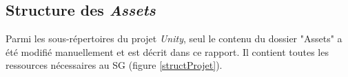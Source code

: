 	\subsection*{Structure des \textit{Assets}}
		Parmi les sous-répertoires du projet \textit{Unity}, seul le contenu du dossier "Assets" a été modifié manuellement et est décrit dans ce rapport. Il contient toutes les ressources nécessaires au SG (figure \ref{structProjet}).\medskip
		
		\begin{minipage}{\linewidth}
			\label{structProjet}
		\end{minipage}\medskip
		
